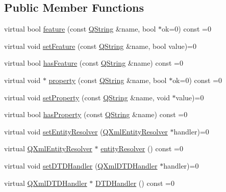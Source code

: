 \subsection*{Public Member Functions}
\begin{DoxyCompactItemize}
\item 
virtual bool \mbox{\hyperlink{class_q_xml_reader_ab4d90af8a5440668582f53e47e9a81d6}{feature}} (const \mbox{\hyperlink{class_q_string}{Q\+String}} \&name, bool $\ast$ok=0) const =0
\item 
virtual void \mbox{\hyperlink{class_q_xml_reader_a6673b0e33ef628df75410fabdafa3684}{set\+Feature}} (const \mbox{\hyperlink{class_q_string}{Q\+String}} \&name, bool value)=0
\item 
virtual bool \mbox{\hyperlink{class_q_xml_reader_ac9835c64b96d42b60f0bec5962153582}{has\+Feature}} (const \mbox{\hyperlink{class_q_string}{Q\+String}} \&name) const =0
\item 
virtual void $\ast$ \mbox{\hyperlink{class_q_xml_reader_a88ea75a8b783f8ef6959d9d83402c579}{property}} (const \mbox{\hyperlink{class_q_string}{Q\+String}} \&name, bool $\ast$ok=0) const =0
\item 
virtual void \mbox{\hyperlink{class_q_xml_reader_aa02ae81ff9636b9961bc333a68ecffa4}{set\+Property}} (const \mbox{\hyperlink{class_q_string}{Q\+String}} \&name, void $\ast$value)=0
\item 
virtual bool \mbox{\hyperlink{class_q_xml_reader_ac26bf52bfab045196e8adf980e92bab6}{has\+Property}} (const \mbox{\hyperlink{class_q_string}{Q\+String}} \&name) const =0
\item 
virtual void \mbox{\hyperlink{class_q_xml_reader_a82a810f10ac48cf35d698f57bc2d4647}{set\+Entity\+Resolver}} (\mbox{\hyperlink{class_q_xml_entity_resolver}{Q\+Xml\+Entity\+Resolver}} $\ast$handler)=0
\item 
virtual \mbox{\hyperlink{class_q_xml_entity_resolver}{Q\+Xml\+Entity\+Resolver}} $\ast$ \mbox{\hyperlink{class_q_xml_reader_ad16d14b4da2560aa3f32ea754d8d1104}{entity\+Resolver}} () const =0
\item 
virtual void \mbox{\hyperlink{class_q_xml_reader_a0b24b1fe26a4c32a8032d68ee14d5dba}{set\+D\+T\+D\+Handler}} (\mbox{\hyperlink{class_q_xml_d_t_d_handler}{Q\+Xml\+D\+T\+D\+Handler}} $\ast$handler)=0
\item 
virtual \mbox{\hyperlink{class_q_xml_d_t_d_handler}{Q\+Xml\+D\+T\+D\+Handler}} $\ast$ \mbox{\hyperlink{class_q_xml_reader_a5c40696cea43c1af838e575b7cf7921c}{D\+T\+D\+Handler}} () const =0
\item 

\end{DoxyCompactItemize}
